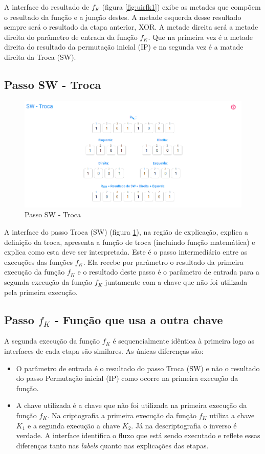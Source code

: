 A interface do resultado de \(f_K\) (figura \ref{fig:uirfk1}) exibe as metades que compõem o resultado da função e a junção destes. A metade esquerda desse resultado sempre será o resultado da etapa anterior, XOR. A metade direita será a metade direita do parâmetro de entrada da função \(f_K\). Que na primeira vez é a metade direita do resultado da permutação inicial (IP) e na segunda vez é a matade direita da Troca (SW).

\subsection{Passo SW - Troca}

\begin{figure}[H]
    \centering
    \caption{Passo SW - Troca}
    \label{fig:uisw}
    \includegraphics[width=1\linewidth]{UI/UISW.png}
\end{figure}

A interface do passo Troca (SW) (figura \ref{fig:uisw}), na região de explicação, explica a definição da troca, apresenta a função de troca (incluindo função matemática) e explica como esta deve ser interpretada. Este é o passo intermediário entre as execuções das funções \(f_K\). Ela recebe por parâmetro o resultado da primeira execução da função \(f_K\) e o resultado deste passo é o parâmetro de entrada para a segunda execução da função \(f_K\) juntamente com a chave que não foi utilizada pela primeira execução.

\subsection{Passo \(f_K\) - Função que usa a outra chave}

A segunda execução da função \(f_K\) é sequencialmente idêntica à primeira logo as interfaces de cada etapa são similares. As únicas diferenças são:
\begin{itemize}
    \item O parâmetro de entrada é o resultado do passo Troca (SW) e não o resultado do passo Permutação inicial (IP) como ocorre na primeira execução da função.
    \item A chave utilizada é a chave que não foi utilizada na primeira execução da função \(f_K\). Na criptografia a primeira execução da função \(f_K\) utiliza a chave \(K_1\) e a segunda execução a chave \(K_2\). Já na descriptografia o inverso é verdade. A interface identifica o fluxo que está sendo executado e reflete essas diferenças tanto nas \textit{labels} quanto nas explicações das etapas.
\end{itemize}

